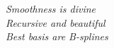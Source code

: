 
\pagebreak

\thispagestyle{empty}

\vspace*{\fill}

\begin{center}
  \emph{%
    Smoothness is divine\\
    Recursive and beautiful\\
    Best basis are B-splines
  }%
\end{center}

\vspace*{\fill}
